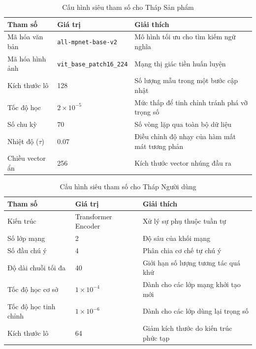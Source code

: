 \begin{table}[H]
    \centering
    \caption{Cấu hình siêu tham số cho Tháp Sản phẩm}
    \label{tab:item_params}
    \vspace{0.2cm}
    \begin{tabular}{l l p{6.5cm}}
        \toprule
        \textbf{Tham số} & \textbf{Giá trị} & \textbf{Giải thích} \\
        \midrule
        Mã hóa văn bản & \texttt{all-mpnet-base-v2} & Mô hình tối ưu cho tìm kiếm ngữ nghĩa \\
        Mã hóa hình ảnh & \texttt{vit\_base\_patch16\_224} & Mạng thị giác tiền huấn luyện \\
        Kích thước lô & 128 & Số lượng mẫu trong một bước cập nhật \\
        Tốc độ học & $2 \times 10^{-5}$ & Mức thấp để tinh chỉnh tránh phá vỡ trọng số \\
        Số chu kỳ & 70 & Số vòng lặp qua toàn bộ dữ liệu \\
        Nhiệt độ ($\tau$) & 0.07 & Điều chỉnh độ nhạy của hàm mất mát tương phản \\
        Chiều vector ẩn & 256 & Kích thước vector nhúng đầu ra \\
        \bottomrule
    \end{tabular}
\end{table}

\begin{table}[H]
    \centering
    \caption{Cấu hình siêu tham số cho Tháp Người dùng}
    \label{tab:user_params}
    \vspace{0.2cm}
    \begin{tabular}{l l p{6.5cm}}
        \toprule
        \textbf{Tham số} & \textbf{Giá trị} & \textbf{Giải thích} \\
        \midrule
        Kiến trúc & Transformer Encoder & Xử lý sự phụ thuộc tuần tự \\
        Số lớp mạng & 2 & Độ sâu của khối mạng \\
        Số đầu chú ý & 4 & Phân chia cơ chế tự chú ý \\
        Độ dài chuỗi tối đa & 40 & Giới hạn số lượng tương tác quá khứ \\
        Tốc độ học cơ sở & $1 \times 10^{-4}$ & Dành cho các lớp mạng khởi tạo mới \\
        Tốc độ học tinh chỉnh & $1 \times 10^{-6}$ & Dành cho các lớp dùng lại trọng số \\
        Kích thước lô & 64 & Giảm kích thước do kiến trúc phức tạp \\
        \bottomrule
    \end{tabular}
\end{table}

